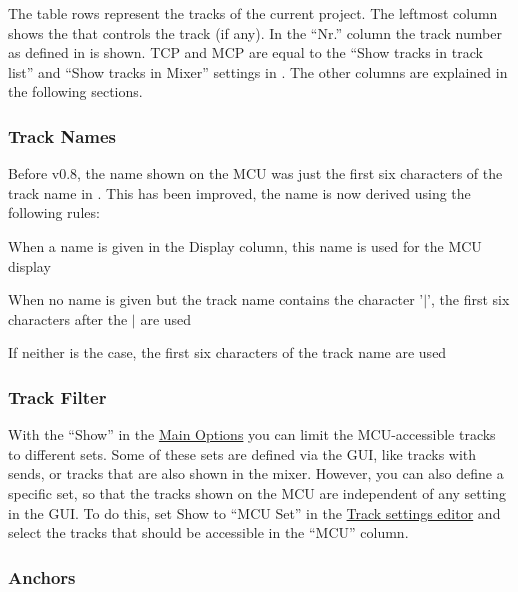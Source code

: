 
The table rows represent the tracks of the current project. The
leftmost column shows the \cs that controls the track (if any). In the
``Nr.'' column the track number as defined in \reaper is shown. TCP and MCP
are equal to the ``Show tracks in track list'' and ``Show tracks in
Mixer'' settings in \reaper. The other columns are explained in the
following sections.

\subsubsection{Track Names}\label{tracknames} 
Before v0.8, the name shown on the MCU was just the first six characters of the
track name in \reaper. This has been  improved, the name is now derived using the
following rules:

\begin{compactitem}
\item When a name is given in the Display column, this name is used
  for the MCU display
\item When no name is given but the track name contains the character
  '$\mid$', the first six characters after the $\mid$ are used
\item If neither is the case, the first six characters of the track
  name are used
\end{compactitem}


\subsubsection{Track Filter}\label{trackfilter}
With the ``Show'' \attribute in the
\hyperref[T:multitrack_options1]{Main Options} you can limit the
MCU-accessible tracks to different sets. Some of these
sets are defined via the \reaper GUI, like tracks
with sends, or tracks that are also shown in the \reaper mixer. However,
you can also define a \mcu specific set, so that the tracks 
shown on the MCU are independent of any setting in the \reaper
GUI. To do this, set  Show \attribute to ``MCU Set'' in the
\hyperref[F:Screenshot_Track_Mode]{Track settings editor} and select
the tracks that should be accessible in the ``MCU'' column.

\subsubsection{Anchors}\label{anchor}

